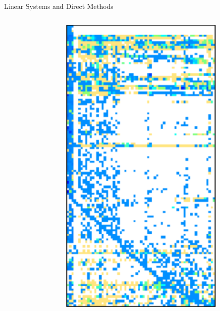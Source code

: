 \begin{frame}{Linear Systems and Direct Methods}
\begin{center}
\begin{columns}
\begin{column}{0.7\textwidth}
      \end{column}
      \begin{column}{0.25\textwidth}
          
        \includegraphics[width=0.8\textwidth]{figures/Maragal_4.pdf}
        
      \end{column}
    \end{columns}
          

        
          

\end{center}
\end{frame}
